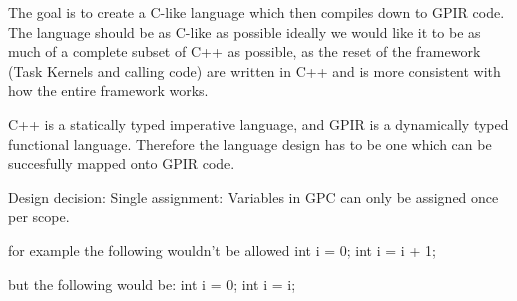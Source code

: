 The goal is to create a C-like language which then compiles down to GPIR code.
The language should be as C-like as possible ideally we would like it to be as much
of a complete subset of C++ as possible, as the reset of the framework (Task Kernels and calling code)
are written in C++ and is more consistent with how the entire framework works.

C++ is a statically typed imperative language, and GPIR is a dynamically typed functional language.
Therefore the language design has to be one which can be succesfully mapped onto GPIR code.

Design decision:
    Single assignment:
       Variables in GPC can only be assigned once per scope.

       for example the following wouldn't be allowed
           int i = 0;
           int i = i + 1;

       but the following would be:
           int i = 0;
           {
               int i = i;
           }
